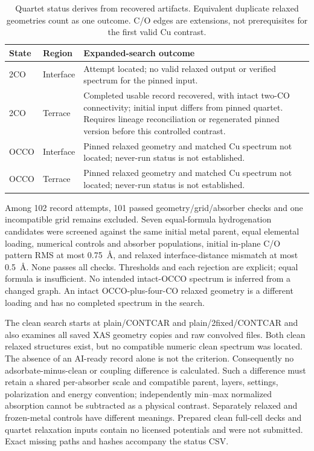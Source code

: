 \begin{table}[htbp]\centering\small\begin{tabularx}{\textwidth}{llX}\toprule State & Region & Expanded-search outcome\\\midrule 2CO & Interface & Attempt located; no valid relaxed output or verified spectrum for the pinned input.\\2CO & Terrace & Completed usable record recovered, with intact two-CO connectivity; initial input differs from pinned quartet. Requires lineage reconciliation or regenerated pinned version before this controlled contrast.\\OCCO & Interface & Pinned relaxed geometry and matched Cu spectrum not located; never-run status is not established.\\OCCO & Terrace & Pinned relaxed geometry and matched Cu spectrum not located; never-run status is not established.\\\bottomrule\end{tabularx}\caption{Quartet status derives from recovered artifacts. Equivalent duplicate relaxed geometries count as one outcome. C/O edges are extensions, not prerequisites for the first valid Cu contrast.}\end{table}

Among 102 record attempts, 101 passed geometry/grid/absorber checks and one incompatible grid remains excluded. Seven equal-formula hydrogenation candidates were screened against the same initial metal parent, equal elemental loading, numerical controls and absorber populations, initial in-plane C/O pattern RMS at most 0.75~\AA{}, and relaxed interface-distance mismatch at most 0.5~\AA{}. None passes all checks. Thresholds and each rejection are explicit; equal formula is insufficient. No intended intact-OCCO spectrum is inferred from a changed graph. An intact OCCO-plus-four-CO relaxed geometry is a different loading and has no completed spectrum in the search.

The clean search starts at plain/CONTCAR and plain/2fixed/CONTCAR and also examines all saved XAS geometry copies and raw convolved files. Both clean relaxed structures exist, but no compatible numeric clean spectrum was located. The absence of an AI-ready record alone is not the criterion. Consequently no adsorbate-minus-clean or coupling difference is calculated. Such a difference must retain a shared per-absorber scale and compatible parent, layers, settings, polarization and energy convention; independently min--max normalized absorption cannot be subtracted as a physical contrast. Separately relaxed and frozen-metal controls have different meanings. Prepared clean full-cell decks and quartet relaxation inputs contain no licensed potentials and were not submitted. Exact missing paths and hashes accompany the status CSV.

